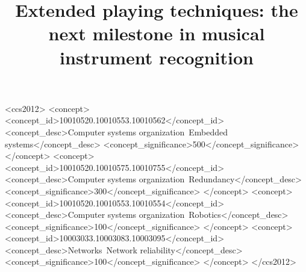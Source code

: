 \documentclass[sigconf, authordraft]{acmart}
\begin{document}
%
%
\begin{CCSXML}
<ccs2012>
 <concept>
  <concept_id>10010520.10010553.10010562</concept_id>
  <concept_desc>Computer systems organization~Embedded systems</concept_desc>
  <concept_significance>500</concept_significance>
 </concept>
 <concept>
  <concept_id>10010520.10010575.10010755</concept_id>
  <concept_desc>Computer systems organization~Redundancy</concept_desc>
  <concept_significance>300</concept_significance>
 </concept>
 <concept>
  <concept_id>10010520.10010553.10010554</concept_id>
  <concept_desc>Computer systems organization~Robotics</concept_desc>
  <concept_significance>100</concept_significance>
 </concept>
 <concept>
  <concept_id>10003033.10003083.10003095</concept_id>
  <concept_desc>Networks~Network reliability</concept_desc>
  <concept_significance>100</concept_significance>
 </concept>
</ccs2012>
\end{CCSXML}





\maketitle

\title{Extended playing techniques: the next milestone in musical instrument recognition}





\end{document}
